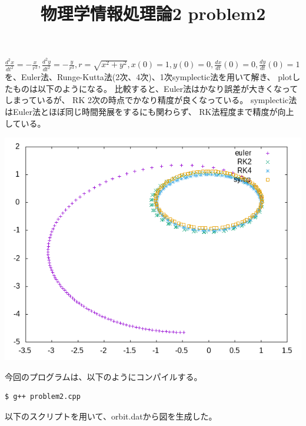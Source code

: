 \documentclass[12pt,a5]{bxjsarticle}
\title{物理学情報処理論2 problem2}
\date{}
\begin{document}
\maketitle

$ \frac{d^2x}{dt^2} = - \frac{x}{r^3},
  \frac{d^2y}{dt^2} = - \frac{y}{r^3},
  r = \sqrt{x^2 + y^2},
  x(0) = 1,
  y(0) = 0,
  \frac{dx}{dt}(0) = 0,
  \frac{dy}{dt}(0) = 1
$
を、Euler法、Runge-Kutta法(2次、4次)、1次symplectic法を用いて解き、
plotしたものは以下のようになる。
比較すると、Euler法はかなり誤差が大きくなってしまっているが、
RK 2次の時点でかなり精度が良くなっている。
symplectic法はEuler法とほぼ同じ時間発展をするにも関わらず、
RK法程度まで精度が向上している。

\includegraphics[width=\linewidth]{orbit.png}

今回のプログラムは、以下のようにコンパイルする。
\begin{lstlisting}[language=bash]
  $ g++ problem2.cpp
\end{lstlisting}

以下のスクリプトを用いて、orbit.datから図を生成した。

\end{document}
